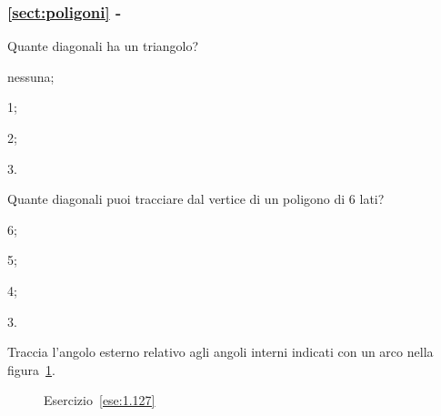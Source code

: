 \begingroup
\hypersetup{linkcolor=black}
\subsubsection*{\ref{sect:poligoni} - }
\endgroup

\begin{esercizio}
\label{ese:1.125}
Quante diagonali ha un triangolo?
\begin{multicols}{4}
\begin{enumeratea}
\item nessuna;
\item 1;
\item 2;
\item 3.
\end{enumeratea}
\end{multicols}
\end{esercizio}

\begin{esercizio}
\label{ese:1.126}
Quante diagonali puoi tracciare dal vertice di un poligono di 6 lati?
\begin{multicols}{4}
\begin{enumeratea}
\item 6;
\item 5;
\item 4;
\item 3.
\end{enumeratea}
\end{multicols}
\end{esercizio}

\begin{esercizio}
\label{ese:1.127}
Traccia l'angolo esterno relativo agli angoli interni indicati con un 
arco nella figura~\ref{fig:ese1.127}.
\end{esercizio}


\begin{inaccessibleblock}
 \begin{figure}[htb]
 \centering
 \caption{Esercizio~\ref{ese:1.127}}\label{fig:ese1.127}
\end{figure}
\end{inaccessibleblock}

